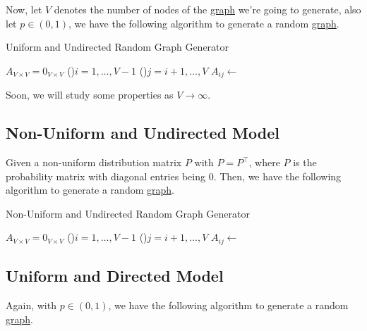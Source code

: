 Now, let \(V\) denotes the number of nodes of the \hyperref[def:graph]{graph} we're going to generate, also let \(p\in(0, 1)\), we have the following algorithm to generate a random \hyperref[def:graph]{graph}.

\begin{algorithm}[H]\label{algo:uniform-and-undirected-model-algo}
	\DontPrintSemicolon
	\caption{Uniform and Undirected Random Graph Generator}
	\BlankLine

	\(A_{V\times V} = 0_{V \times V}\) 
	\;
	\For(){\(i= 1, \dots  , V-1\)}{
		\For(){\(j=i+1, \dots  , V\)}{
			\(A_{ij} \gets \)
		}
	}
	\;
\end{algorithm}

Soon, we will study some properties as \(V\to \infty\).

\subsection{Non-Uniform and Undirected Model}\label{subsec:non-uniform-and-undirected-model}
Given a non-uniform distribution matrix \(P\) with \(P = P^{\top}\), where \(P\) is the probability matrix with diagonal entries being \(0\). Then, we have the following algorithm to generate a random \hyperref[def:graph]{graph}.

\begin{algorithm}[H]\label{algo:non-uniform-and-undirected-model-algo}
	\DontPrintSemicolon
	\caption{Non-Uniform and Undirected Random Graph Generator}
	\BlankLine

	\(A_{V\times V} = 0_{V \times V}\) 
	\;
	\For(){\(i= 1, \dots  , V-1\)}{
	\For(){\(j=i+1, \dots  , V\)}{
	\(A_{ij} \gets \)
	}
	}
	\;
\end{algorithm}

\subsection{Uniform and Directed Model}\label{subsec:uniform-and-directed-model}
Again, with \(p\in(0, 1)\), we have the following algorithm to generate a random \hyperref[def:graph]{graph}.

